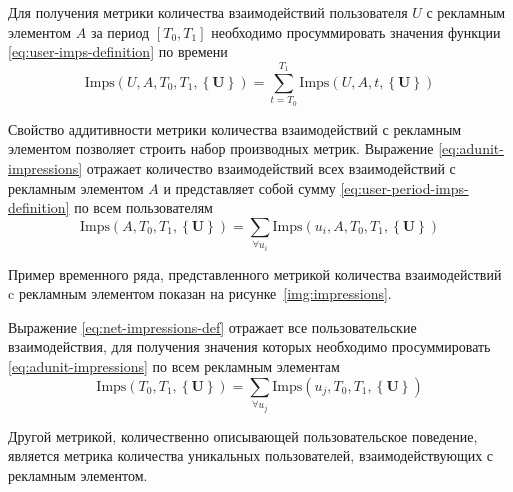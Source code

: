 Для получения метрики количества взаимодействий пользователя $U$ с рекламным элементом $A$ за период $\left[T_0, T_1\right]$
необходимо просуммировать значения функции \eqref{eq:user-imps-definition} по времени
\begin{equation}
    \text{Imps} \left( U, A, T_0, T_1, \left\{ \mathbf{U} \right\} \right) =
    \sum \limits_{t=T_0}^{T_1} \text{Imps} \left( U, A, t, \left\{ \mathbf{U} \right\} \right) 
    \label{eq:user-period-imps-definition}
\end{equation}

Свойство аддитивности метрики количества взаимодействий с рекламным элементом позволяет строить набор производных метрик.
Выражение \eqref{eq:adunit-impressions} отражает количество взаимодействий всех взаимодействий с рекламным элементом $A$
и представляет собой сумму \eqref{eq:user-period-imps-definition} по всем пользователям
\begin{equation}
    \text{Imps} \left(A, T_0, T_1, \left\{ \mathbf{U} \right\} \right) =
    \sum \limits_{\forall u_i} \text{Imps} \left( u_i, A, T_0, T_1, \left\{ \mathbf{U} \right\} \right)
    \label{eq:adunit-impressions}
\end{equation}

Пример временного ряда, представленного метрикой количества взаимодействий c рекламным элементом показан на рисунке~\ref{img:impressions}.


Выражение \eqref{eq:net-impressions-def} отражает все пользовательские взаимодействия, для получения значения которых необходимо 
просуммировать \eqref{eq:adunit-impressions} по всем рекламным элементам
\begin{equation}
    \text{Imps} \left(T_0, T_1, \left\{ \mathbf{U} \right\} \right) =
    \sum \limits_{\forall u_j} \text{Imps} \left(u_j, T_0, T_1, \left\{ \mathbf{U} \right\} \right)
    \label{eq:net-impressions-def}
\end{equation}

Другой метрикой, количественно описывающей пользовательское поведение, является метрика количества уникальных пользователей,
взаимодействующих с рекламным элементом.

